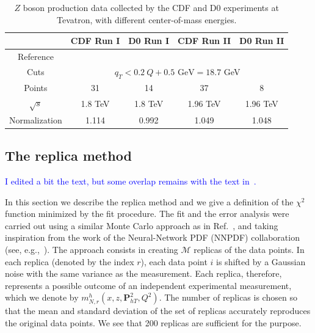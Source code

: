 \documentclass[aps,preprintnumbers,showpacs,nofootinbib,superscriptaddress,floatfix]{revtex4}
\newcommand{\Tperp}{T}
\begin{document}
\begin{table}[h!]
\begin{center}
\renewcommand{\tabcolsep}{0.4pc} %
\renewcommand{\arraystretch}{1.2} %
\begin{tabular}{|c|c|c|c|c|}
 \hline
 ~                        & CDF Run I    &  D0 Run I        & CDF Run II        & D0 Run II      \\
 \hline
 Reference        &\cite{Affolder:1999jh} &\cite{Abbott:1999wk}&\cite{Aaltonen:2012fi}&\cite{Abazov:2007ac} \\
\hline
Cuts             & \multicolumn{4}{c|}{$q_T< 0.2\ Q +0.5 \text{ GeV}=18.7$ GeV}                                  \\
\hline
 Points                   &      31      &   14             &       37          &        8       \\
 \hline
 $\sqrt{s}$               &      1.8 TeV &   1.8 TeV        &       1.96 TeV    &       1.96 TeV   \\
 \hline
Normalization        &  1.114       &    0.992          &       1.049        &       1.048    \\
\hline
\end{tabular}
\caption{$Z$ boson production data collected by the CDF and D0 experiments at Tevatron, with different center-of-mass energies.}
\label{t:data_Z}
\end{center}
\end{table}



\subsection{The replica method}
\label{ss:replica_method}

\textcolor{blue}{I edited a bit the text, but some overlap remains with the text in~\cite{Signori:2013mda}.}

In this section we describe the replica method and we give a definition of the $\chi^2$ function minimized by the fit procedure.
The fit and the error analysis were carried out using a similar Monte Carlo approach as in Ref.~\cite{Bacchetta:2012ty,Signori:2013mda,Radici:2015mwa}, and taking
inspiration from the work of the Neural-Network PDF (NNPDF) collaboration (see, e.g.,~\cite{Forte:2002fg,Ball:2008by,Ball:2010de}). 
The approach consists in creating $\mathcal{M}$ replicas of the data points. In each replica (denoted by the index $r$), each data point $i$ is shifted by a Gaussian noise with the same variance as the measurement. 
Each replica, therefore, represents a possible outcome of an independent experimental measurement, which we denote by $m_{N, r}^{h}(x, z, \bm{P}_{h\Tperp}^2, Q^2)$. 
The number of replicas is chosen so that the mean and standard deviation of the set of replicas accurately reproduces the original data points. We see that 200 replicas are sufficient for the purpose.
\end{document}
